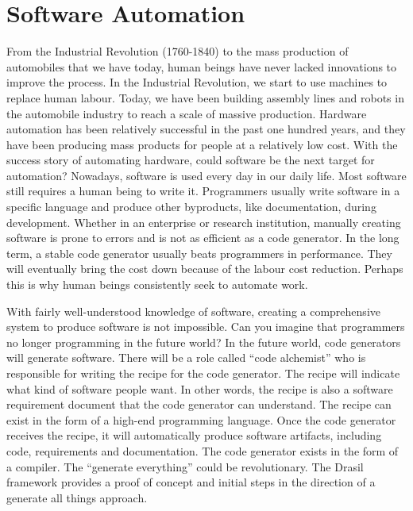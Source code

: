 \chapter{Software Automation}
From the Industrial Revolution (1760-1840) to the mass production of automobiles that we have today, human beings have never lacked innovations to improve the process. In the Industrial Revolution, we start to use machines to replace human labour. Today, we have been building assembly lines and robots in the automobile industry to reach a scale of massive production. Hardware automation has been relatively successful in the past one hundred years, and they have been producing mass products for people at a relatively low cost. With the success story of automating hardware, could software be the next target for automation? Nowadays, software is used every day in our daily life. Most software still requires a human being to write it. Programmers usually write software in a specific language and produce other byproducts, like documentation, during development. Whether in an enterprise or research institution, manually creating software is prone to errors and is not as efficient as a code generator. In the long term, a stable code generator usually beats programmers in performance. They will eventually bring the cost down because of the labour cost reduction. Perhaps this is why human beings consistently seek to automate work. 

With fairly well-understood knowledge of software, creating a comprehensive system to produce software is not impossible. Can you imagine that programmers no longer programming in the future world? In the future world, code generators will generate software. There will be a role called ``code alchemist'' who is responsible for writing the recipe for the code generator. The recipe will indicate what kind of software people want. In other words, the recipe is also a software requirement document that the code generator can understand. The recipe can exist in the form of a high-end programming language. Once the code generator receives the recipe, it will automatically produce software artifacts, including code, requirements and documentation. The code generator exists in the form of a compiler. The ``generate everything'' could be revolutionary. The Drasil framework provides a proof of concept and initial steps in the direction of a generate all things approach.
